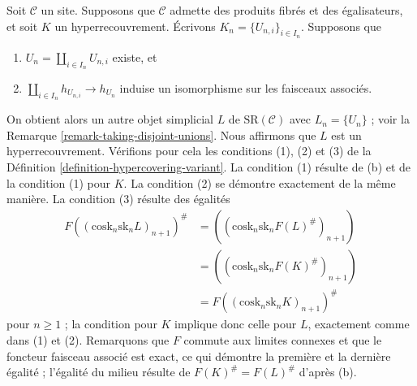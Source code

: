 \begin{remark}
\label{remark-take-unions-hypercovering}
Soit $\mathcal{C}$ un site. Supposons que $\mathcal{C}$ admette
des produits fibrés et des égalisateurs, et soit $K$ un hyperrecouvrement.
Écrivons $K_n = \{U_{n, i}\}_{i \in I_n}$. Supposons que
\begin{enumerate}
\item[(a)] $U_n = \coprod_{i \in I_n} U_{n, i}$ existe, et
\item[(b)] $\coprod_{i \in I_n} h_{U_{n, i}} \to h_{U_n}$ induise
un isomorphisme sur les faisceaux associés.
\end{enumerate}
On obtient alors un autre objet simplicial $L$ de $\text{SR}(\mathcal{C})$
avec $L_n = \{U_n\}$ ; voir
la Remarque \ref{remark-taking-disjoint-unions}.
Nous affirmons que $L$ est un hyperrecouvrement.
Vérifions pour cela les conditions (1), (2) et (3) de la
Définition \ref{definition-hypercovering-variant}.
La condition (1) résulte de (b) et de la condition (1) pour $K$.
La condition (2) se démontre exactement de la même manière.
La condition (3) résulte des égalités
\begin{align*}
F((\text{cosk}_n \text{sk}_n L)_{n + 1})^\#
& =
((\text{cosk}_n \text{sk}_n F(L)^\#)_{n + 1}) \\
& =
((\text{cosk}_n \text{sk}_n F(K)^\#)_{n + 1}) \\
& =
F((\text{cosk}_n \text{sk}_n K)_{n + 1})^\#
\end{align*}
pour $n \geq 1$ ; la condition pour $K$ implique donc celle pour
$L$, exactement comme dans (1) et (2).
Remarquons que $F$ commute aux limites connexes et que le foncteur faisceau associé est exact,
ce qui démontre la première et la dernière égalité ; l'égalité du milieu résulte de
$F(K)^\# = F(L)^\#$ d'après (b).
\end{remark}


